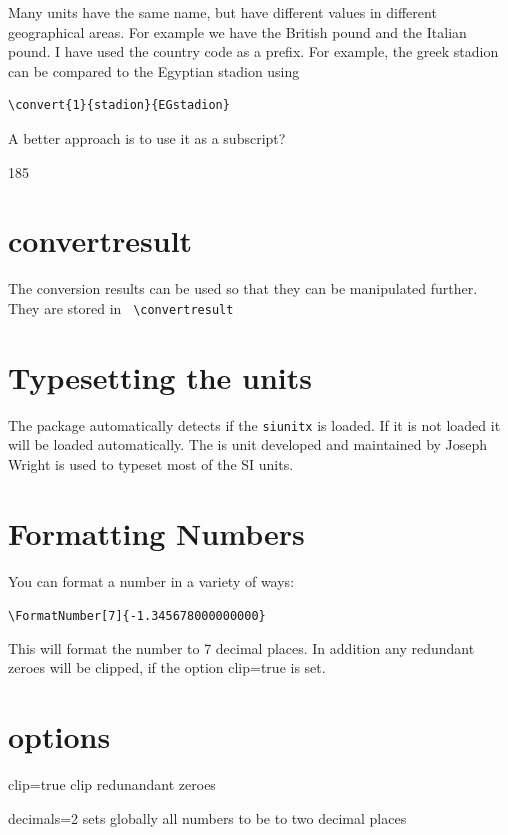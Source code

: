\documentclass{tufte-book}
\newcommand\FormatNumber[2][2]{%
 \FPclip\temp{#2}
 \FPround\temp{\temp}{#1}
 \temp
}
\gdef\SetConversion#1#2#3{%
\expandafter\gdef\csname#1#2\endcsname{#3}%
\gdef\Temp{#3}
\FPdiv\invert{1}{\Temp}
\expandafter\gdef\csname#2#1\endcsname{\invert}
}
\begin{document}
Many units have the same name, but have different values in different geographical areas. For example we have the British pound and the Italian pound. I have used the country code as a prefix. For example, the greek stadion can be compared to the Egyptian stadion using

\begin{verbatim}
\convert{1}{stadion}{EGstadion}
\end{verbatim}

A better approach is to use it as a subscript?

\SetConversion{stadion-greek}{m}{185}






\section{convertresult}

The conversion results can be used so that they can be manipulated further. They are stored in \verb+ \convertresult+


\section{Typesetting the units}

The package automatically detects if the \texttt{siunitx} is loaded. If it is not loaded it will be loaded automatically. The is unit developed and maintained by Joseph Wright is used to typeset most of the SI units.

\section{Formatting Numbers}

You can format a number in a variety of ways:

\verb+\FormatNumber[7]{-1.345678000000000}+

\FormatNumber[5]{3.28976756}

This will format the number to 7 decimal places. In addition any redundant zeroes will be clipped, if the option clip=true is set.

\section{options}

clip=true  clip redunandant zeroes

decimals=2 sets globally all numbers to be to two decimal places
\end{document}
